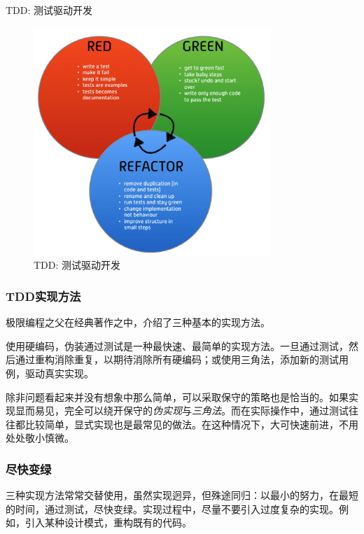 \begin{content}
\begin{episode}{TDD: 测试驱动开发}
\begin{content}
\begin{figure}[H]
\centering
\includegraphics[width=0.8\textwidth]{figures/xunit/tdd-cycle.png}
\caption{TDD: 测试驱动开发}
 \label{fig:tdd-cycle}
\end{figure}

\subsubsection{TDD实现方法}

极限编程之父在经典著作之中，介绍了三种基本的实现方法。

\begin{enum}
\end{enum}

使用硬编码，伪装通过测试是一种最快速、最简单的实现方法。一旦通过测试，然后通过重构消除重复，以期待消除所有硬编码；或使用三角法，添加新的测试用例，驱动真实实现。

除非问题看起来并没有想象中那么简单，可以采取保守的策略也是恰当的。如果实现显而易见，完全可以绕开保守的\emph{伪实现}与\emph{三角法}。而在实际操作中，通过测试往往都比较简单，显式实现也是最常见的做法。在这种情况下，大可快速前进，不用处处敬小慎微。

\subsubsection{尽快变绿}

三种实现方法常常交替使用，虽然实现迥异，但殊途同归：以最小的努力，在最短的时间，通过测试，尽快变绿。实现过程中，尽量不要引入过度复杂的实现。例如，引入某种设计模式，重构既有的代码。


\end{content}
\end{episode}
\end{content}
